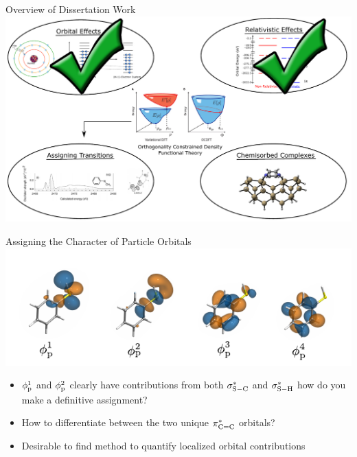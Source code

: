 \documentclass[t]{beamer}
\begin{document}
\begin{frame}{Overview of Dissertation Work}
\centering
\includegraphics[width=\linewidth]{project_intro_3.pdf}
\end{frame}

\begin{frame}{Assigning the Character of Particle Orbitals}
\centering
\includegraphics[width=\linewidth]{assigning_particles.pdf}
\begin{itemize}
\item $\phi^1_{\rm p}$ and $\phi^2_{\rm p}$ clearly have contributions from both $\sigma^*_{\rm S-C}$ and 
$\sigma^*_{\rm S-H}$ how do you make a definitive assignment?
\item How to differentiate between the two unique $\pi^*_{\rm C=C}$ orbitals?
\item Desirable to find method to quantify localized orbital contributions
\end{itemize}
\end{frame}
\end{document}
